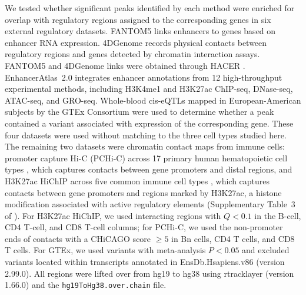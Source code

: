 We tested whether significant peaks identified by each method were enriched for overlap with regulatory regions assigned to the corresponding genes in six external regulatory datasets. FANTOM5 \cite{andersson2014atlas} links enhancers to genes based on enhancer RNA expression. 4DGenome \cite{teng2015fourdgenome} records physical contacts between regulatory regions and genes detected by chromatin interaction assays. FANTOM5 and 4DGenome links were obtained through HACER \cite{wang2019hacer}. EnhancerAtlas~2.0 \cite{gao2020enhanceratlas} integrates enhancer annotations from 12 high-throughput experimental methods, including H3K4me1 and H3K27ac ChIP-seq, DNase-seq, ATAC-seq, and GRO-seq. Whole-blood cis-eQTLs mapped in European-American subjects by the GTEx Consortium \cite{gtex2017genetic} were used to determine whether a peak contained a variant associated with expression of the corresponding gene. These four datasets were used without matching to the three cell types studied here. The remaining two datasets were chromatin contact maps from immune cells: promoter capture Hi-C (PCHi-C) across 17 primary human hematopoietic cell types \cite{javierre2016pchic}, which captures contacts between gene promoters and distal regions, and H3K27ac HiChIP across five common immune cell types \cite{chandra2021pieqtl}, which captures contacts between gene promoters and regions marked by H3K27ac, a histone modification associated with active regulatory elements (Supplementary Table~3 of \cite{chandra2021pieqtl}). For H3K27ac HiChIP, we used interacting regions with $Q<0.1$ in the B-cell, CD4 T-cell, and CD8 T-cell columns; for PCHi-C, we used the non-promoter ends of contacts with a CHiCAGO score $\geq 5$ in Bn cells, CD4 T cells, and CD8 T cells. For GTEx, we used variants with meta-analysis $P<0.05$ and excluded variants located within transcripts annotated in EnsDb.Hsapiens.v86 (version 2.99.0). All regions were lifted over from hg19 to hg38 using rtracklayer (version 1.66.0) \cite{lawrence2009rtracklayer} and the \texttt{hg19ToHg38.over.chain} file.

